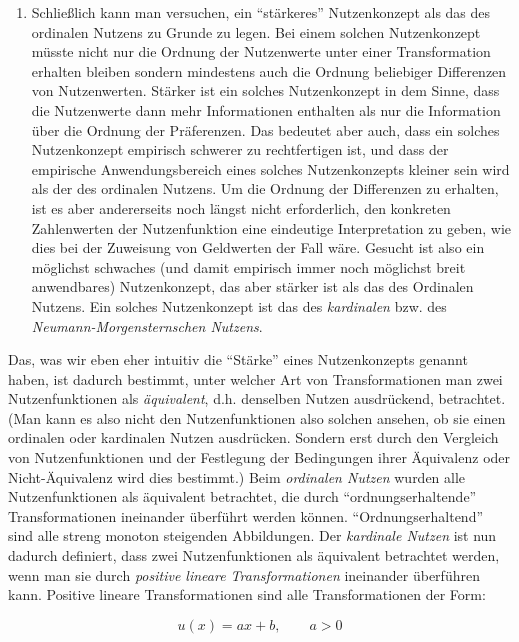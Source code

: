 \begin{enumerate}
  \item Schließlich kann man versuchen, ein "`stärkeres"' Nutzenkonzept als das
  des ordinalen Nutzens zu Grunde zu legen.
  Bei einem solchen Nutzenkonzept
  müsste nicht nur die Ordnung der Nutzenwerte unter einer Transformation
  erhalten bleiben sondern mindestens auch die Ordnung beliebiger Differenzen
  von Nutzenwerten. Stärker ist ein solches Nutzenkonzept in dem Sinne,
  dass die Nutzenwerte dann mehr Informationen enthalten als nur die
  Information über die Ordnung der Präferenzen. Das bedeutet aber auch, dass
  ein solches Nutzenkonzept empirisch schwerer zu rechtfertigen ist, und dass
  der empirische Anwendungsbereich eines solches Nutzenkonzepts
  kleiner sein wird als der des ordinalen Nutzens. Um
  die Ordnung der Differenzen zu erhalten, ist es aber andererseits noch längst
  nicht erforderlich, den konkreten Zahlenwerten der Nutzenfunktion eine
  eindeutige Interpretation zu geben, wie dies bei der Zuweisung von Geldwerten
  der Fall wäre. Gesucht ist also ein möglichst schwaches (und damit 
  empirisch immer noch möglichst breit anwendbares) Nutzenkonzept, das
  aber stärker ist als das des Ordinalen Nutzens. 
  Ein solches Nutzenkonzept ist das des {\em
  kardinalen} bzw. des {\em Neumann-Morgensternschen Nutzens}.
\end{enumerate}

Das, was wir eben eher intuitiv die "`Stärke"' eines Nutzenkonzepts genannt
haben, ist dadurch bestimmt, unter welcher Art von Transformationen man zwei
Nutzenfunktionen als {\em äquivalent}, d.h. denselben Nutzen ausdrückend,
betrachtet. (Man kann es also nicht den Nutzenfunktionen also solchen ansehen, ob
sie einen ordinalen oder kardinalen Nutzen ausdrücken. Sondern erst durch den
Vergleich von Nutzenfunktionen und der Festlegung der Bedingungen ihrer
Äquivalenz oder Nicht-Äquivalenz wird dies bestimmt.) Beim {\em ordinalen Nutzen}
wurden alle Nutzenfunktionen als äquivalent betrachtet, die durch
"`ordnungserhaltende"' Transformationen ineinander überführt werden können.
"`Ordnungserhaltend"' sind alle streng monoton steigenden Abbildungen. Der {\em
kardinale Nutzen} ist nun dadurch definiert, dass zwei Nutzenfunktionen als
äquivalent betrachtet werden, wenn man sie durch {\em positive lineare
Transformationen} ineinander überführen kann. Positive lineare Transformationen
sind alle Transformationen der Form:

\begin{displaymath}
u(x) = ax + b, \qquad a > 0
\end{displaymath}

